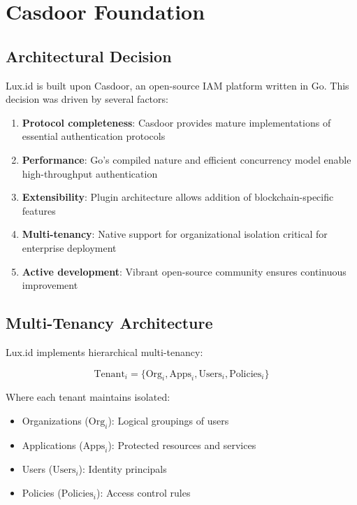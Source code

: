 \section{Casdoor Foundation}


\subsection{Architectural Decision}

Lux.id is built upon Casdoor, an open-source IAM platform written in Go. This decision was driven by several factors:

\begin{enumerate}
    \item \textbf{Protocol completeness}: Casdoor provides mature implementations of essential authentication protocols
    \item \textbf{Performance}: Go's compiled nature and efficient concurrency model enable high-throughput authentication
    \item \textbf{Extensibility}: Plugin architecture allows addition of blockchain-specific features
    \item \textbf{Multi-tenancy}: Native support for organizational isolation critical for enterprise deployment
    \item \textbf{Active development}: Vibrant open-source community ensures continuous improvement
\end{enumerate}

\subsection{Multi-Tenancy Architecture}

Lux.id implements hierarchical multi-tenancy:

\begin{equation}
    \text{Tenant}_i = \{\text{Org}_i, \text{Apps}_i, \text{Users}_i, \text{Policies}_i\}
\end{equation}

Where each tenant maintains isolated:
\begin{itemize}
    \item Organizations ($\text{Org}_i$): Logical groupings of users
    \item Applications ($\text{Apps}_i$): Protected resources and services
    \item Users ($\text{Users}_i$): Identity principals
    \item Policies ($\text{Policies}_i$): Access control rules
\end{itemize}

